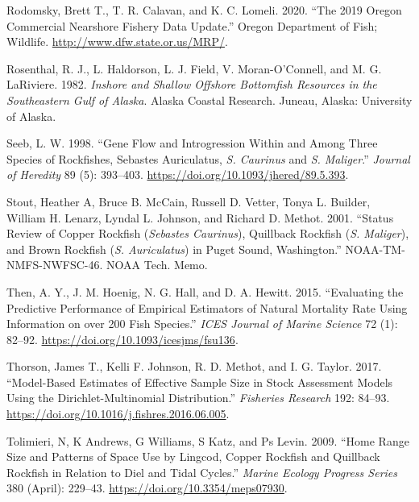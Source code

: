 \documentclass[11pt,
  english,
  a4paper,
]{article}
\begin{document}
\leavevmode\hypertarget{ref-rodomsky_2019_2020}{}%
Rodomsky, Brett T., T. R. Calavan, and K. C. Lomeli. 2020. ``The 2019 Oregon Commercial Nearshore Fishery Data Update.'' Oregon Department of Fish; Wildlife. \url{http://www.dfw.state.or.us/MRP/}.

\leavevmode\hypertarget{ref-Rosenthaletal_maturity_1982}{}%
Rosenthal, R. J., L. Haldorson, L. J. Field, V. Moran-O'Connell, and M. G. LaRiviere. 1982. \emph{Inshore and Shallow Offshore Bottomfish Resources in the Southeastern Gulf of Alaska}. Alaska Coastal Research. Juneau, Alaska: University of Alaska.

\leavevmode\hypertarget{ref-seeb_gene_1998}{}%
Seeb, L. W. 1998. ``Gene Flow and Introgression Within and Among Three Species of Rockfishes, Sebastes Auriculatus, \emph{S. Caurinus} and \emph{S. Maliger}.'' \emph{Journal of Heredity} 89 (5): 393--403. \url{https://doi.org/10.1093/jhered/89.5.393}.

\leavevmode\hypertarget{ref-Stoutetal_DPS_2001}{}%
Stout, Heather A, Bruce B. McCain, Russell D. Vetter, Tonya L. Builder, William H. Lenarz, Lyndal L. Johnson, and Richard D. Methot. 2001. ``Status Review of Copper Rockfish (\emph{Sebastes Caurinus}), Quillback Rockfish (\emph{S. Maliger}), and Brown Rockfish (\emph{S. Auriculatus}) in Puget Sound, Washington.'' NOAA-TM-NMFS-NWFSC-46. NOAA Tech. Memo.

\leavevmode\hypertarget{ref-then_evaluating_2015-1}{}%
Then, A. Y., J. M. Hoenig, N. G. Hall, and D. A. Hewitt. 2015. ``Evaluating the Predictive Performance of Empirical Estimators of Natural Mortality Rate Using Information on over 200 Fish Species.'' \emph{ICES Journal of Marine Science} 72 (1): 82--92. \url{https://doi.org/10.1093/icesjms/fsu136}.

\leavevmode\hypertarget{ref-thorson_model-based_2017}{}%
Thorson, James T., Kelli F. Johnson, R. D. Methot, and I. G. Taylor. 2017. ``Model-Based Estimates of Effective Sample Size in Stock Assessment Models Using the Dirichlet-Multinomial Distribution.'' \emph{Fisheries Research} 192: 84--93. \url{https://doi.org/10.1016/j.fishres.2016.06.005}.

\leavevmode\hypertarget{ref-tolimieri_home_2009}{}%
Tolimieri, N, K Andrews, G Williams, S Katz, and Ps Levin. 2009. ``Home Range Size and Patterns of Space Use by Lingcod, Copper Rockfish and Quillback Rockfish in Relation to Diel and Tidal Cycles.'' \emph{Marine Ecology Progress Series} 380 (April): 229--43. \url{https://doi.org/10.3354/meps07930}.
\end{document}
